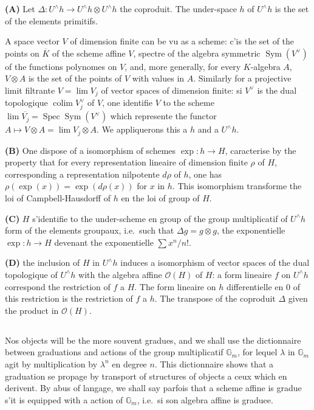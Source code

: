 \documentclass[11pt,a4paper]{article}
\theoremstyle{plain}
\theoremstyle{definition}
\DeclareMathOperator{\Spec}{Spec}
\DeclareMathOperator{\colim}{colim}
\DeclareMathOperator{\Sym}{Sym}
\newcommand{\Gm}{\mathbb{G}_m}
\begin{document}
\textbf{(A)} Let $\Delta: U^{\wedge}h \to U^{\wedge}h \otimes U^{\wedge}h$ the coproduit. The under-space $h$ of $U^{\wedge}h$ is the set of the elements primitifs.

A space vector $V$ of dimension finite can be vu as a scheme: c'is the set of the points on $\overline{K}$ of the scheme affine $V$, spectre of the algebra symmetric $\Sym(V^{\vee})$ of the functions polynomes on $V$, and, more generally, for every $K$-algebra $A$, $V \otimes A$ is the set of the points of $V$ with values in $A$. Similarly for a projective limit filtrante $V = \lim V_j$ of vector spaces of dimension finite: si $V^{\vee}$ is the dual topologique $\colim V_j^{\vee}$ of $V$, one identifie $V$ to the scheme $\lim \overline{V_j} = \Spec \Sym(V^{\vee})$ which represente the functor $A \mapsto V \otimes A = \lim V_j \otimes A$. We appliquerons this a $h$ and a $U^{\wedge}h$.

\textbf{(B)} One dispose of a isomorphism of schemes $\exp: h \to H$, caracterise by the property that for every representation lineaire of dimension finite $\rho$ of $H$, corresponding a representation nilpotente $d\rho$ of $h$, one has $\rho(\exp(x)) = \exp(d\rho(x))$ for $x$ in $h$. This isomorphism transforme the loi of Campbell-Hausdorff of $h$ en the loi of group of $H$.

\textbf{(C)} $H$ s'identifie to the under-scheme en group of the group multiplicatif of $U^{\wedge}h$ form of the elements groupaux, i.e.~such that $\Delta g = g \otimes g$, the exponentielle $\exp: h \to H$ devenant the exponentielle $\sum x^n/n!$.

\textbf{(D)} the inclusion of $H$ in $U^{\wedge}h$ induces a isomorphism of vector spaces of the dual topologique of $U^{\wedge}h$ with the algebra affine $\mathcal{O}(H)$ of $H$: a form lineaire $f$ on $U^{\wedge}h$ correspond the restriction of $f$ a $H$. The form lineaire on $h$ differentielle en $0$ of this restriction is the restriction of $f$ a $h$. The transpose of the coproduit $\Delta$ given the product in $\mathcal{O}(H)$.

\subsection{}
Nos objects will be the more souvent gradues, and we shall use the dictionnaire between graduations and actions of the group multiplicatif $\Gm$, for lequel $\lambda$ in $\Gm$ agit by multiplication by $\lambda^n$ en degree $n$. This dictionnaire shows that a graduation se propage by transport of structures of objects a ceux which en derivent. By abus of langage, we shall say parfois that a scheme affine is gradue s'it is equipped with a action of $\Gm$, i.e.~si son algebra affine is graduee.
\end{document}
